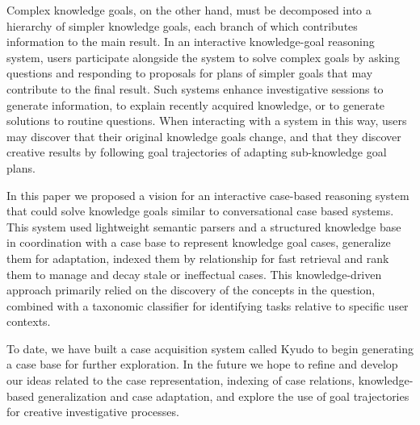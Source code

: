 \documentclass{llncs}
\begin{document}
Complex knowledge goals, on the other hand, must be decomposed into a hierarchy of simpler knowledge goals, each branch of which contributes information to the main result. In an interactive knowledge-goal reasoning system, users participate alongside the system to solve complex goals by asking questions and responding to proposals for plans of simpler goals that may contribute to the final result. Such systems enhance investigative sessions to generate information, to explain recently acquired knowledge, or to generate solutions to routine questions. When interacting with a system in this way, users may discover that their original knowledge goals change, and that they discover creative results by following goal trajectories of adapting sub-knowledge goal plans.

In this paper we proposed a vision for an interactive case-based reasoning system that could solve knowledge goals similar to conversational case based systems. This system used lightweight semantic parsers and a structured knowledge base in coordination with a case base to represent knowledge goal cases, generalize them for adaptation, indexed them by relationship for fast retrieval and rank them to manage and decay stale or ineffectual cases. This knowledge-driven approach primarily relied on the discovery of the concepts in the question, combined with a taxonomic classifier for identifying tasks relative to specific user contexts.

To date, we have built a case acquisition system called Kyudo to begin generating a case base for further exploration. In the future we hope to refine and develop our ideas related to the case representation, indexing of case relations, knowledge-based generalization and case adaptation, and explore the use of goal trajectories for creative investigative processes.



\end{document}
